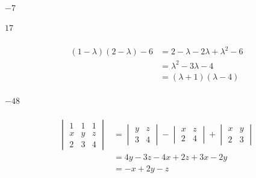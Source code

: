\documentclass{article}
\begin{document}
\setcounter{subsubsection}{8}
\subsubsection{}

$-7$

\setcounter{subsubsection}{10}
\subsubsection{}

$17$

\setcounter{subsubsection}{12}
\subsubsection{}

\begin{align*}
  (1 - \lambda)(2 - \lambda) - 6 & = 2 - \lambda - 2 \lambda + \lambda^2 - 6 \\
                                 & = \lambda^2 - 3 \lambda - 4               \\
                                 & = (\lambda + 1) (\lambda - 4)
\end{align*}

\setcounter{subsubsection}{14}
\subsubsection{}

$-48$

\setcounter{subsubsection}{22}
\subsubsection{}

\begin{align*}
  \begin{vmatrix}
    1 & 1 & 1 \\
    x & y & z \\
    2 & 3 & 4
  \end{vmatrix} & = \begin{vmatrix}
                      y & z \\
                      3 & 4
                    \end{vmatrix} - \begin{vmatrix}
                                      x & z \\
                                      2 & 4
                                    \end{vmatrix} + \begin{vmatrix}
                                                      x & y \\
                                                      2 & 3
                                                    \end{vmatrix} \\
                  & = 4 y - 3 z - 4 x + 2 z + 3 x - 2 y            \\
                  & = -x + 2 y - z
\end{align*}
\end{document}
